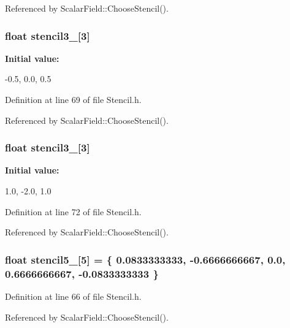 Referenced by ScalarField::ChooseStencil().

\subsubsection[{stencil3\_\-1}]{\setlength{\rightskip}{0pt plus 5cm}float {\bf stencil3\_}\mbox{[}3\mbox{]}}\label{Stencil_8h_a4c00704278597cb60e8b47f2dced4887}
{\bfseries Initial value:}
\begin{DoxyCode}
 { -0.5,
                0.0,
                0.5 }
\end{DoxyCode}


Definition at line 69 of file Stencil.h.



Referenced by ScalarField::ChooseStencil().

\subsubsection[{stencil3\_\-2}]{\setlength{\rightskip}{0pt plus 5cm}float {\bf stencil3\_}\mbox{[}3\mbox{]}}\label{Stencil_8h_ac0b1e74d97ac3b2b641c229d69a8301b}
{\bfseries Initial value:}
\begin{DoxyCode}
 { 1.0,
                -2.0,
                1.0 }
\end{DoxyCode}


Definition at line 72 of file Stencil.h.



Referenced by ScalarField::ChooseStencil().

\subsubsection[{stencil5\_\-1}]{\setlength{\rightskip}{0pt plus 5cm}float {\bf stencil5\_}\mbox{[}5\mbox{]} = \{ 0.0833333333, -\/0.6666666667, 0.0, 0.6666666667, -\/0.0833333333 \}}\label{Stencil_8h_a340ae7c6d18197d5b0b39316adf09c92}


Definition at line 66 of file Stencil.h.



Referenced by ScalarField::ChooseStencil().

